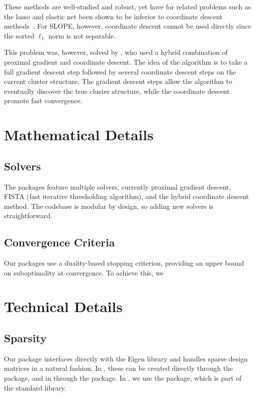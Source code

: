 \documentclass[article]{jss}
\begin{document}
These methods are well-studied and robust, yet have for related problems such
as the lasso and elastic net been shown to be inferior to coordinate descent
methods~\citep{friedman2007,friedman2010}. For SLOPE, however, coordinate
descent cannot be used directly since the sorted \(\ell_1\) norm is not
separable.

This problem was, however, solved by \citet{larsson2023}, who used a hybrid
combination of proximal gradient and coordinate descent. The idea of the
algorithm is to take a full gradient descent step followed by several
coordinate descent steps on the current cluster structure. The gradient descent
steps allow the algorithm to eventually discover the true cluster structure,
while the coordinate descent promote fast convergence.

\section{Mathematical Details}

\subsection{Solvers}

The packages feature multiple solvers, currently proximal gradient descent,
FISTA (fast iterative thresholding algorithm), and the hybrid
coordinate descent method. The codebase is modular by design, so
adding new solvers is straightforward.

\subsection{Convergence Criteria}

Our packages use a duality-based stopping criterion, providing an upper
bound on suboptimality at convergence. To achieve this, we

\section{Technical Details}

\subsection{Sparsity}

Our package interfaces directly with the Eigen library and handles
sparse design matrices in a natural fashion. In , these
can be created directly through the  package, and in
 through the  package. In
, we use the  package, which is
part of the standard library.
\end{document}

